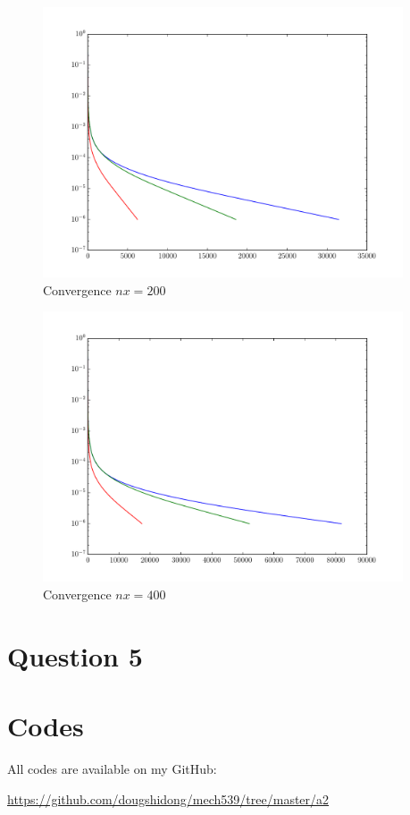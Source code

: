 \documentclass[letterpaper,12pt,]{article}
\begin{document}
\begin{figure}[!h]
    \centering
    \includegraphics[width = 0.95\textwidth]{./Figures/Conv200.pdf}
    \caption{Convergence $nx = 200$}
    \label{fig:u200}
\end{figure}
\begin{figure}[!h]
    \centering
    \includegraphics[width = 0.95\textwidth]{./Figures/Conv400.pdf}
    \caption{Convergence $nx = 400$}
    \label{fig:u400}
\end{figure}
\section*{Question 5}


\section*{Codes}

All codes are available on my GitHub:

\url{https://github.com/dougshidong/mech539/tree/master/a2}
\end{document}
